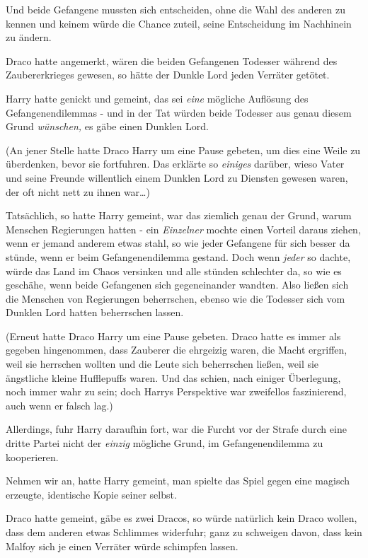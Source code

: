 {Und beide Gefangene mussten sich entscheiden, ohne die Wahl des anderen zu kennen und keinem würde die Chance zuteil, seine Entscheidung im Nachhinein zu ändern.

Draco hatte angemerkt, wären die beiden Gefangenen Todesser während des Zaubererkrieges gewesen, so hätte der Dunkle Lord jeden Verräter getötet.

Harry hatte genickt und gemeint, das sei \emph{eine} mögliche Auflösung des Gefangenendilemmas - und in der Tat würden beide Todesser aus genau diesem Grund \emph{wünschen,} es gäbe einen Dunklen Lord.

(An jener Stelle hatte Draco Harry um eine Pause gebeten, um dies eine Weile zu überdenken, bevor sie fortfuhren. Das erklärte so \emph{einiges} darüber, wieso Vater und seine Freunde willentlich einem Dunklen Lord zu Diensten gewesen waren, der oft nicht nett zu ihnen war…)

Tatsächlich, so hatte Harry gemeint, war das ziemlich genau der Grund, warum Menschen Regierungen hatten - ein \emph{Einzelner} mochte einen Vorteil daraus ziehen, wenn er jemand anderem etwas stahl, so wie jeder Gefangene für sich besser da stünde, wenn er beim Gefangenendilemma gestand. Doch wenn \emph{jeder} so dachte, würde das Land im Chaos versinken und alle stünden schlechter da, so wie es geschähe, wenn beide Gefangenen sich gegeneinander wandten. Also ließen sich die Menschen von Regierungen beherrschen, ebenso wie die Todesser sich vom Dunklen Lord hatten beherrschen lassen.

(Erneut hatte Draco Harry um eine Pause gebeten. Draco hatte es immer als gegeben hingenommen, dass Zauberer die ehrgeizig waren, die Macht ergriffen, weil sie herrschen wollten und die Leute sich beherrschen ließen, weil sie ängstliche kleine Hufflepuffs waren. Und das schien, nach einiger Überlegung, noch immer wahr zu sein; doch Harrys Perspektive war zweifellos faszinierend, auch wenn er falsch lag.)

Allerdings, fuhr Harry daraufhin fort, war die Furcht vor der Strafe durch eine dritte Partei nicht der \emph{einzig} mögliche Grund, im Gefangenendilemma zu kooperieren.

Nehmen wir an, hatte Harry gemeint, man spielte das Spiel gegen eine magisch erzeugte, identische Kopie seiner selbst.

Draco hatte gemeint, gäbe es zwei Dracos, so würde natürlich kein Draco wollen, dass dem anderen etwas Schlimmes widerfuhr; ganz zu schweigen davon, dass kein Malfoy sich je einen Verräter würde schimpfen lassen.

}
